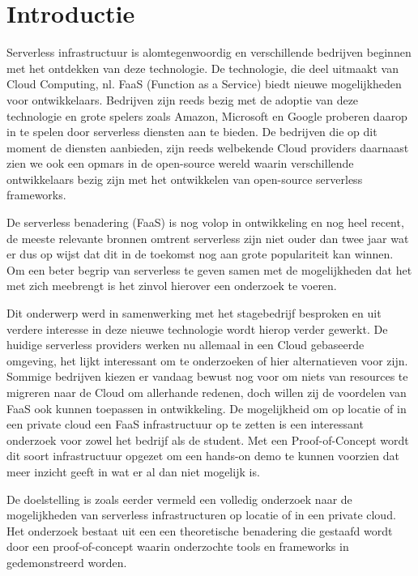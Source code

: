 
\section{Introductie} %
\label{sec:introductie}
Serverless infrastructuur is alomtegenwoordig en verschillende bedrijven beginnen met het ontdekken van deze technologie. De technologie, die deel uitmaakt van Cloud Computing, nl. FaaS (Function as a Service)  biedt nieuwe mogelijkheden voor ontwikkelaars. Bedrijven zijn reeds bezig met de adoptie van deze technologie en grote spelers zoals Amazon, Microsoft en Google proberen daarop in te spelen door serverless diensten aan te bieden. De bedrijven die op dit moment de diensten aanbieden, zijn reeds welbekende Cloud providers daarnaast zien we ook een opmars in de open-source wereld waarin verschillende ontwikkelaars bezig zijn met het ontwikkelen van open-source serverless frameworks.


De serverless benadering (FaaS) is nog volop in ontwikkeling en nog heel recent, de meeste relevante bronnen omtrent serverless zijn niet ouder dan twee jaar wat er dus op wijst dat dit in de toekomst nog aan grote populariteit kan winnen. Om een beter begrip van serverless te geven samen met de mogelijkheden dat het met zich meebrengt is het zinvol hierover een onderzoek te voeren. 


Dit onderwerp werd in samenwerking met het stagebedrijf besproken en uit verdere interesse in deze nieuwe technologie wordt hierop verder gewerkt. De huidige serverless providers werken nu allemaal in een Cloud gebaseerde omgeving, het lijkt interessant om te onderzoeken of hier alternatieven voor zijn. Sommige bedrijven kiezen er vandaag bewust nog voor om niets van resources te migreren naar de Cloud om allerhande redenen, doch willen zij de voordelen van FaaS ook kunnen toepassen in ontwikkeling. De mogelijkheid om op locatie of in een private cloud een FaaS infrastructuur op te zetten is een interessant onderzoek voor zowel het bedrijf als de student. Met een Proof-of-Concept wordt dit soort infrastructuur opgezet om een hands-on demo te kunnen voorzien dat meer inzicht geeft in wat er al dan niet mogelijk is.


De doelstelling is zoals eerder vermeld een volledig onderzoek naar de mogelijkheden van serverless infrastructuren op locatie of in een private cloud. Het onderzoek bestaat uit een een theoretische benadering die gestaafd wordt door een proof-of-concept waarin onderzochte tools en frameworks in gedemonstreerd worden.


